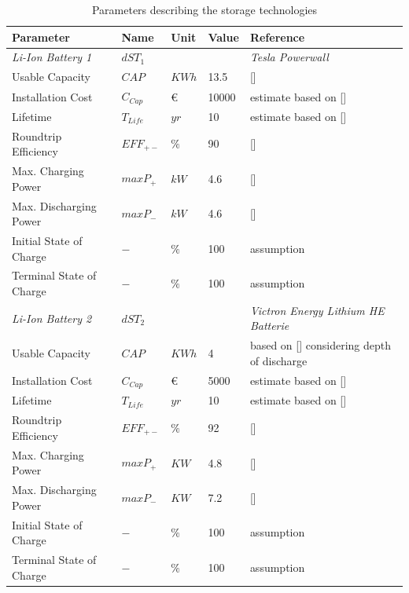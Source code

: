 \documentclass[
	11pt,								%
	DIV10,								%
	a4paper,         					%
	oneside,							%
	headheight=20pt,					%
	footheight=20pt,					%
    parskip=full,						%
    listof=totoc,						%
	bibliography=totoc,					%
	index=totoc,						%
]{scrartcl}
\begin{document}
\begin{table}[H]
	\centering
	\caption{Parameters describing the storage technologies}
	\begin{tabular}{lllll}
		\hline
		\textbf{Parameter}			& \textbf{Name}			& \textbf{Unit}			& \textbf{Value}	&\textbf{Reference}     \\ \hline
		\textit{Li-Ion Battery 1} & $dST_1$ & & &\textit{Tesla Powerwall} \\
		Usable Capacity				   & $CAP$ 		& $KWh$ 				& 13.5 				& [\cite{PowerwallTesla2018}] 	\\
		Installation Cost              & $C_{Cap}$        	& \euro\ 				& 10000				& estimate based on [\cite{PowerwallTesla2018}]  \\
		Lifetime			               & $T_{Life}$       	& $yr$  				& 10 				& estimate based on [\cite{PowerwallTesla2018}] \\
		Roundtrip Efficiency           & $EFF_{+-}$     	& $\%$  				& 90				& [\cite{PowerwallTesla2018}]  \\
		Max. Charging Power            & $maxP_+$    	& $kW$  				& 4.6 				& [\cite{PowerwallTesla2018}]     \\
		Max. Discharging Power         & $maxP_-$     	& $kW$   				& 4.6 				& [\cite{PowerwallTesla2018}]      \\
		Initial State of Charge        & $-$     	& $\%$  				& 100 				& assumption   \\
		Terminal State of Charge       & $-$     	& $\%$  				& 100 				& assumption   \\
		\hline
		\textit{Li-Ion Battery 2} & $dST_2$ & & & \textit{Victron Energy Lithium HE Batterie} \\
		Usable Capacity				   & $CAP$ 		& $KWh$ 				& 4 				& based on [\cite{LithiumIonenHEHigh2018}] considering depth of discharge\\
		Installation Cost              & $C_{Cap}$     	& \euro\  				& 5000				& estimate based on [\cite{VictronEnergyLithium2018}]  \\
		Lifetime			               & $T_{Life}$     	& $yr$  				& 10 				& estimate based on [\cite{LithiumIonenHEHigh2018}]   \\
		Roundtrip Efficiency           & $EFF_{+-}$      	& $\%$  				& 92 				& [\cite{LAUINGER201624}]   \\
		Max. Charging Power            & $maxP_+$    	& $KW$  				& 4.8				& [\cite{LithiumIonenHEHigh2018}]   \\
		Max. Discharging Power         & $maxP_-$     	& $KW$   				& 7.2				& [\cite{LithiumIonenHEHigh2018}]   \\
		Initial State of Charge        & $-$     	& $\%$  				& 100 				& assumption	   \\
		Terminal State of Charge       & $-$    	& $\%$  				& 100 				& assumption   \\	
		\hline
	\end{tabular}
\end{table}
\end{document}
